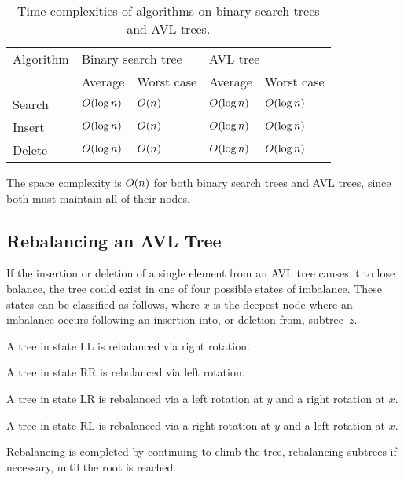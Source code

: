 \begin{table}[htp]
  \centering
  \caption*{Time complexities of algorithms on binary search trees and AVL trees.}
  \begin{tabular}{lllll}
    \toprule
    Algorithm & \multicolumn{2}{l}{Binary search tree} & \multicolumn{2}{l}{AVL tree} \\
    \cmidrule{2-3} \cmidrule{4-5}
    & Average & Worst case & Average & Worst case \\
    \midrule
    Search & \( O\!\left(\log n\right) \) & \( O\!\left(n\right) \) & \( O\!\left(\log n\right) \) & \( O\!\left(\log n\right) \) \\
    Insert & \( O\!\left(\log n\right) \) & \( O\!\left(n\right) \) & \( O\!\left(\log n\right) \) & \( O\!\left(\log n\right) \) \\
    Delete & \( O\!\left(\log n\right) \) & \( O\!\left(n\right) \) & \( O\!\left(\log n\right) \) & \( O\!\left(\log n\right) \) \\
    \bottomrule
  \end{tabular}
\end{table}

The space complexity is \( O\!\left(n\right) \) for both binary search trees and AVL trees, since both must maintain all of their nodes.

\subsection{Rebalancing an AVL Tree}

If the insertion or deletion of a single element from an AVL tree causes it to lose balance, the tree could exist in one of four possible states of imbalance.
These states can be classified as follows, where \( x \) is the deepest node where an imbalance occurs following an insertion into, or deletion from, subtree~\( z \).


A tree in state LL is rebalanced via right rotation.


A tree in state RR is rebalanced via left rotation.


A tree in state LR is rebalanced via a left rotation at \( y \) and a right rotation at \( x \).


A tree in state RL is rebalanced via a right rotation at \( y \) and a left rotation at \( x \).

Rebalancing is completed by continuing to climb the tree, rebalancing subtrees if necessary, until the root is reached.
